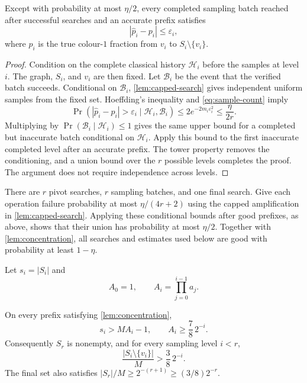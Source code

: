 \begin{lemma}\label{lem:concentration}
Except with probability at most $\eta/2$, every completed sampling batch
reached after successful searches and an accurate prefix satisfies
\[
 |\widehat p_i-p_i|\le\varepsilon_i,
\]
where $p_i$ is the true colour-$1$ fraction from $v_i$ to
$S_i\setminus\{v_i\}$.
\end{lemma}

\begin{proof}
Condition on the complete classical history $\mathcal H_i$ before the samples
at level $i$.  The graph, $S_i$, and $v_i$ are then fixed.  Let
$\mathcal B_i$ be the event that the verified batch succeeds.  Conditional on
$\mathcal B_i$, \cref{lem:capped-search} gives independent uniform samples
from the fixed set.  Hoeffding's inequality \cite{Hoeffding1963} and
\cref{eq:sample-count} imply
\[
 \Pr\!\left(
 |\widehat p_i-p_i|>\varepsilon_i\mid\mathcal H_i,\mathcal B_i
 \right)
 \le2e^{-2m_i\varepsilon_i^2}
 \le\frac{\eta}{2r}.
\]
Multiplying by $\Pr(\mathcal B_i\mid\mathcal H_i)\le1$ gives the same upper
bound for a completed but inaccurate batch conditional on $\mathcal H_i$.
Apply this bound to the first inaccurate completed level after an accurate
prefix.  The tower property removes the conditioning, and a union bound over
the $r$ possible levels completes the proof.  The argument does not require
independence across levels.
\end{proof}

There are $r$ pivot searches, $r$ sampling batches, and one final search.
Give each operation failure probability at most $\eta/(4r+2)$ using the
capped amplification in \cref{lem:capped-search}.  Applying these conditional
bounds after good prefixes, as above, shows that their union has probability
at most $\eta/2$.  Together with \cref{lem:concentration}, all searches and
estimates used below are good with probability at least $1-\eta$.

Let $s_i=|S_i|$ and
\[
 A_0=1,
 \qquad A_i=\prod_{j=0}^{i-1}a_j.
\]

\begin{lemma}\label{lem:survival}
On every prefix satisfying \cref{lem:concentration},
\[
 s_i>MA_i-1,
 \qquad
 A_i\ge\frac78\,2^{-i}.
\]
Consequently $S_r$ is nonempty, and for every sampling level $i<r$,
\[
 \frac{|S_i\setminus\{v_i\}|}{M}
 >\frac38\,2^{-i}.
\]
The final set also satisfies
$|S_r|/M\ge2^{-(r+1)}\ge(3/8)2^{-r}$.
\end{lemma}


